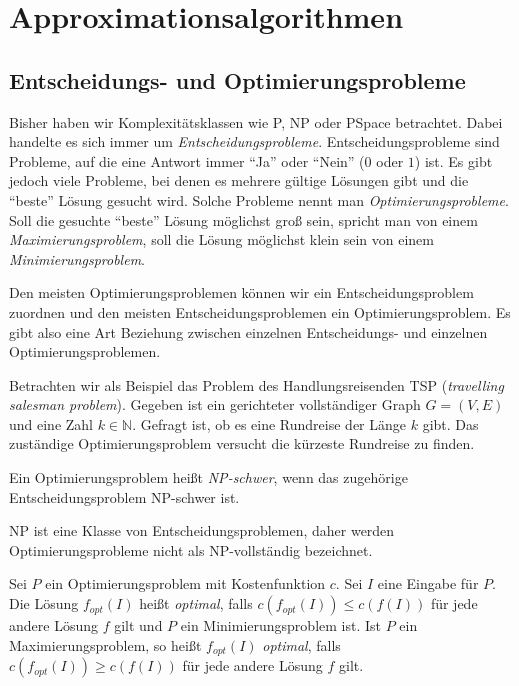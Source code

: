 \chapter{Approximationsalgorithmen}
\section{Entscheidungs- und Optimierungsprobleme}
Bisher haben wir Komplexitätsklassen wie \textsf{P}, \textsf{NP} oder \textsf{PSpace} betrachtet. Dabei handelte es sich immer um \textit{Entscheidungsprobleme}. Entscheidungsprobleme sind Probleme, auf die eine Antwort immer "`Ja"' oder "`Nein"' ($0$ oder $1$) ist. Es gibt jedoch viele Probleme, bei denen es mehrere gültige Lösungen gibt und die "`beste"' Lösung gesucht wird. Solche Probleme nennt man \textit{Optimierungsprobleme}. Soll die gesuchte "`beste"' Lösung möglichst groß sein, spricht man von einem \textit{Maximierungsproblem}, soll die Lösung möglichst klein sein von einem \textit{Minimierungsproblem}.

Den meisten Optimierungsproblemen können wir ein Entscheidungsproblem zuordnen und den meisten Entscheidungsproblemen ein Optimierungsproblem. Es gibt also eine Art Beziehung zwischen einzelnen Entscheidungs- und einzelnen Optimierungsproblemen.

Betrachten wir als Beispiel das Problem des Handlungsreisenden \textsc{TSP} (\textit{travelling salesman problem}). Gegeben ist ein gerichteter vollständiger Graph $G=(V, E)$ und eine Zahl $k \in \mathbb{N}$. Gefragt ist, ob es eine Rundreise der Länge $k$ gibt. Das zuständige Optimierungsproblem versucht die kürzeste Rundreise zu finden.

\begin{Def}
  \hspace{\parindent}Ein Optimierungsproblem heißt \textit{\textsf{NP}-schwer}, wenn das zugehörige Entscheidungsproblem \textsf{NP}-schwer ist.
\end{Def}

\begin{Anm}
  \hspace{\parindent}\textsf{NP} ist eine Klasse von Entscheidungsproblemen, daher werden Optimierungsprobleme nicht als \textsf{NP}-vollständig bezeichnet.
\end{Anm}

\begin{Def}
  \hspace{\parindent}Sei $P$ ein Optimierungsproblem mit Kostenfunktion $c$. Sei $I$ eine Eingabe für $P$. Die Lösung $f_{opt}(I)$ heißt \textit{optimal}, falls $c(f_{opt}(I)) \le c(f(I))$ für jede andere Lösung $f$ gilt und $P$ ein Minimierungsproblem ist. Ist $P$ ein Maximierungsproblem, so heißt $f_{opt}(I)$ \textit{optimal}, falls $c(f_{opt}(I)) \ge c(f(I))$ für jede andere Lösung $f$ gilt.
\end{Def}

